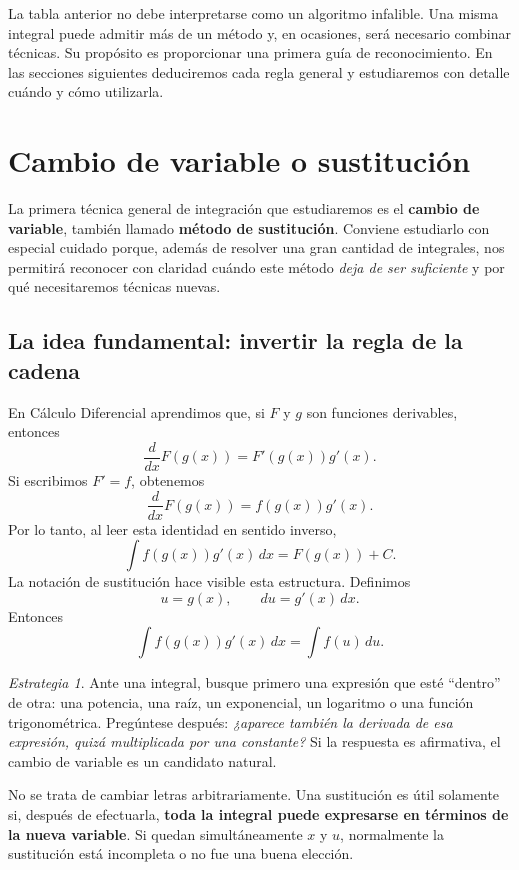 \documentclass[12pt]{article}
\theoremstyle{definition}\newtheorem{definicion}[teorema]{Definición}\newtheorem{ejemplo}[teorema]{Ejemplo}\newtheorem{ejercicio}[teorema]{Ejercicio}
\theoremstyle{remark}\newtheorem*{observacion}{Observación}\newtheorem*{advertencia}{Advertencia}\newtheorem*{estrategia}{Estrategia}
\begin{document}
La tabla anterior no debe interpretarse como un algoritmo infalible. Una misma integral puede admitir más de un método y, en ocasiones, será necesario combinar técnicas. Su propósito es proporcionar una primera guía de reconocimiento. En las secciones siguientes deduciremos cada regla general y estudiaremos con detalle cuándo y cómo utilizarla.

\section{Cambio de variable o sustitución}

La primera técnica general de integración que estudiaremos es el \textbf{cambio de variable}, también llamado \textbf{método de sustitución}. Conviene estudiarlo con especial cuidado porque, además de resolver una gran cantidad de integrales, nos permitirá reconocer con claridad cuándo este método \emph{deja de ser suficiente} y por qué necesitaremos técnicas nuevas.

\subsection{La idea fundamental: invertir la regla de la cadena}

En Cálculo Diferencial aprendimos que, si $F$ y $g$ son funciones derivables, entonces
\[
\frac{d}{dx}F(g(x))=F'(g(x))g'(x).
\]
Si escribimos $F'=f$, obtenemos
\[
\frac{d}{dx}F(g(x))=f(g(x))g'(x).
\]
Por lo tanto, al leer esta identidad en sentido inverso,
\[
\boxed{\int f(g(x))g'(x)\,dx=F(g(x))+C.}
\]
La notación de sustitución hace visible esta estructura. Definimos
\[
u=g(x),\qquad du=g'(x)\,dx.
\]
Entonces
\[
\boxed{\int f(g(x))g'(x)\,dx=\int f(u)\,du.}
\]

\begin{estrategia}
Ante una integral, busque primero una expresión que esté ``dentro'' de otra: una potencia, una raíz, un exponencial, un logaritmo o una función trigonométrica. Pregúntese después: \emph{¿aparece también la derivada de esa expresión, quizá multiplicada por una constante?} Si la respuesta es afirmativa, el cambio de variable es un candidato natural.
\end{estrategia}

No se trata de cambiar letras arbitrariamente. Una sustitución es útil solamente si, después de efectuarla, \textbf{toda la integral puede expresarse en términos de la nueva variable}. Si quedan simultáneamente $x$ y $u$, normalmente la sustitución está incompleta o no fue una buena elección.
\end{document}

